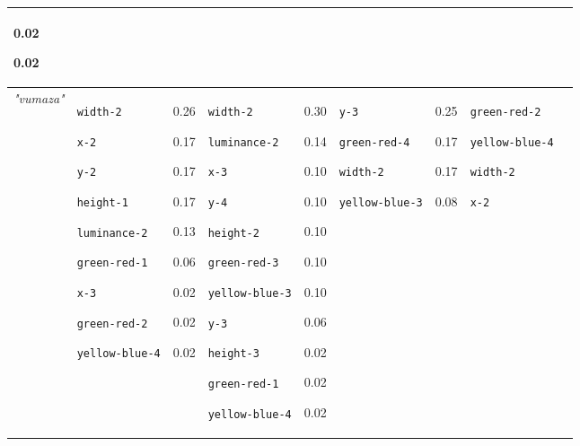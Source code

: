 {\begin{tabular}{@{}p{1.2cm}|p{2.75cm}@{}p{0.8cm}@{}|p{2.75cm}@{}p{0.8cm}@{}|p{2.75cm}@{}p{0.8cm}@{}|p{2.75cm}@{}p{0.8cm}@{}}
0.02

0.02\\
\hline
\textit{"vumaza"} & \texttt{width-2}

\texttt{x-2}

\texttt{y-2}

\texttt{height-1}

\texttt{luminance-2}

\texttt{green-red-1}

\texttt{x-3}

\texttt{green-red-2}

\texttt{yellow-blue-4} & 0.26

0.17

0.17

0.17

0.13

0.06

0.02

0.02

0.02 & \texttt{width-2}

\texttt{luminance-2}

\texttt{x-3}

\texttt{y-4}

\texttt{height-2}

\texttt{green-red-3}

\texttt{yellow-blue-3}

\texttt{y-3}

\texttt{height-3}

\texttt{green-red-1}

\texttt{yellow-blue-4} & 0.30

0.14

0.10

0.10

0.10

0.10

0.10

0.06

0.02

0.02

0.02 & \texttt{y-3}

\texttt{green-red-4}

\texttt{width-2}

\texttt{yellow-blue-3} & 0.25

0.17

0.17

0.08 & \texttt{green-red-2}

\texttt{yellow-blue-4}

\texttt{width-2}

\texttt{x-2}


\end{tabular}}
